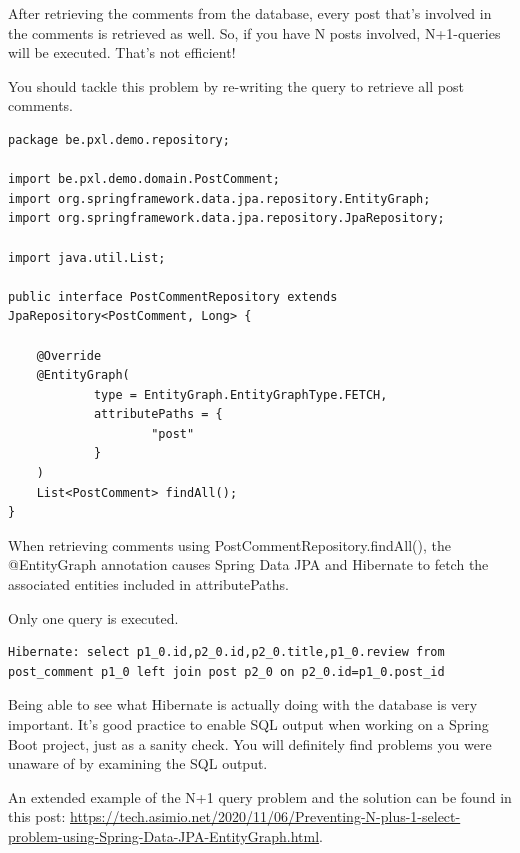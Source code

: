After retrieving the comments from the database, every post that's involved in the comments is retrieved as well. So, if you have N posts involved, N+1-queries will be executed. That's not efficient!

You should tackle this problem by re-writing the query to retrieve all post comments.

\begin{lstlisting}
package be.pxl.demo.repository;

import be.pxl.demo.domain.PostComment;
import org.springframework.data.jpa.repository.EntityGraph;
import org.springframework.data.jpa.repository.JpaRepository;

import java.util.List;

public interface PostCommentRepository extends JpaRepository<PostComment, Long> {

    @Override
    @EntityGraph(
            type = EntityGraph.EntityGraphType.FETCH,
            attributePaths = {
                    "post"
            }
    )
    List<PostComment> findAll();
}
\end{lstlisting}

When retrieving comments using PostCommentRepository.findAll(), the @EntityGraph annotation causes Spring Data JPA and Hibernate to fetch the associated entities included in attributePaths.

Only one query is executed.

\begin{lstlisting}
Hibernate: select p1_0.id,p2_0.id,p2_0.title,p1_0.review from post_comment p1_0 left join post p2_0 on p2_0.id=p1_0.post_id
\end{lstlisting}

Being able to see what Hibernate is actually doing with the database is very important.
It's good practice to enable SQL output when working on a Spring Boot project, just as a sanity check. 
You will definitely find problems you were unaware of by examining the SQL output.

An extended example of the N+1 query problem and the solution can be found in this post: \url{https://tech.asimio.net/2020/11/06/Preventing-N-plus-1-select-problem-using-Spring-Data-JPA-EntityGraph.html}.





